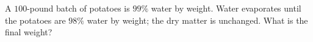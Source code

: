 A $100$-pound batch of potatoes is $99\%$ water by weight. Water evaporates until the potatoes are $98\%$ water by weight; the dry matter is unchanged. What is the final weight?
